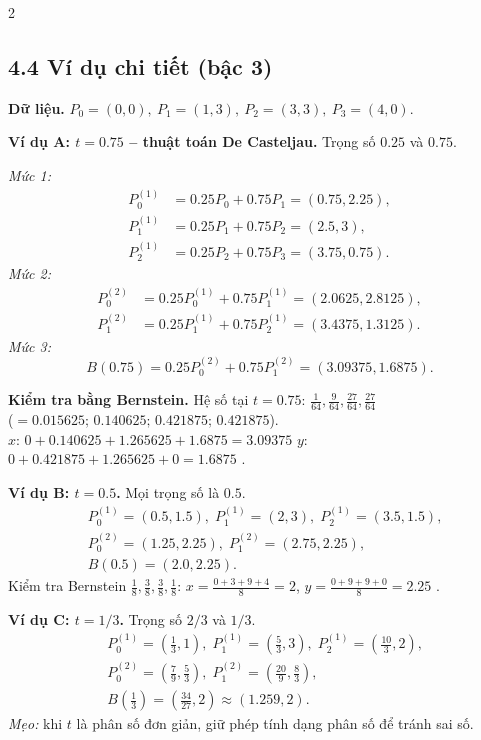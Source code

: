 \begin{paracol}{2}
\switchcolumn

\subsection*{4.4 Ví dụ chi tiết (bậc 3)}

\textbf{Dữ liệu.} $P_0=(0,0),\ P_1=(1,3),\ P_2=(3,3),\ P_3=(4,0)$.

\medskip
\textbf{Ví dụ A: $t=0.75$ -- thuật toán De Casteljau.} Trọng số $0.25$ và $0.75$.

\emph{Mức 1:}
\begin{align*}
P_0^{(1)} &= 0.25P_0+0.75P_1=(0.75,2.25),\\
P_1^{(1)} &= 0.25P_1+0.75P_2=(2.5,3),\\
P_2^{(1)} &= 0.25P_2+0.75P_3=(3.75,0.75).
\end{align*}
\emph{Mức 2:}
\begin{align*}
P_0^{(2)} &= 0.25P_0^{(1)}+0.75P_1^{(1)}=(2.0625,2.8125),\\
P_1^{(2)} &= 0.25P_1^{(1)}+0.75P_2^{(1)}=(3.4375,1.3125).
\end{align*}
\emph{Mức 3:}
\[
B(0.75)=0.25P_0^{(2)}+0.75P_1^{(2)}=\boxed{(3.09375,1.6875)}.
\]

\textbf{Kiểm tra bằng Bernstein.} Hệ số tại $t{=}0.75$:
$\tfrac{1}{64},\tfrac{9}{64},\tfrac{27}{64},\tfrac{27}{64}$ \\
($=0.015625;\,0.140625;\,0.421875;\,0.421875$).\\
$x$: $0{+}0.140625{+}1.265625{+}1.6875{=}3.09375$ \checkmark\;
$y$: $0{+}0.421875{+}1.265625{+}0{=}1.6875$ \checkmark.

\medskip
\textbf{Ví dụ B: $t=0.5$.} Mọi trọng số là $0.5$.
\begin{align*}
&P_0^{(1)}=(0.5,1.5),\;P_1^{(1)}=(2,3),\;P_2^{(1)}=(3.5,1.5),\\
&P_0^{(2)}=(1.25,2.25),\;P_1^{(2)}=(2.75,2.25),\\
&B(0.5)=(2.0,2.25).
\end{align*}
Kiểm tra Bernstein $\tfrac18,\tfrac38,\tfrac38,\tfrac18$:
$x=\tfrac{0+3+9+4}{8}=2$, $y=\tfrac{0+9+9+0}{8}=2.25$ \checkmark.

\medskip
\textbf{Ví dụ C: $t=1/3$.} Trọng số $2/3$ và $1/3$.
\begin{align*}
&P_0^{(1)}=(\tfrac13,1),\;P_1^{(1)}=(\tfrac{5}{3},3),\;P_2^{(1)}=(\tfrac{10}{3},2),\\
&P_0^{(2)}=(\tfrac{7}{9},\tfrac{5}{3}),\;P_1^{(2)}=(\tfrac{20}{9},\tfrac{8}{3}),\\
&B(\tfrac13)=(\tfrac{34}{27},2)\approx(1.259,2).
\end{align*}
\emph{Mẹo:} khi $t$ là phân số đơn giản, giữ phép tính dạng phân số để tránh sai số.


\end{paracol}

